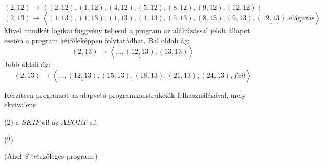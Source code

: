 \documentclass[a4paper,12pt]{article}
\theoremstyle{definition}
\begin{document}
	\begin{solution}
		\begin{stuki}[12cm]
			\begin{WHILE}{2}{}
				\begin{CASE}{1}{2}
				\end{CASE}
			\end{WHILE}
		\end{stuki}
	\[
	(2,12) \rightarrow \left\langle (2,12), (1,12), (4,12), (5,12), (8,12), (9,12), (12,12) \right\rangle
	\]
	\[
	(2,13) \rightarrow \left\langle (1,13), (1,13), (1,13), (4,13), (5,13), (8,13), (9,13), \underline{(12, 13)},\text{elágazás} \right\rangle
	\]
	Mivel mindkét logikai függvény teljesül a program az aláhúzással jelölt állapot esetén a program kétféleképpen folytatódhat.
	Bal oldali ág:
	\[
	(2,13) \rightarrow \left\langle \dots, \underline{(12, 13)}, (13,13)\right\rangle
	\]
	Jobb oldali ág:
	\[
	(2,13) \rightarrow \left\langle \dots, \underline{(12, 13)}, (15,13), (18, 13), (21, 13), (24,13), fail \right\rangle
	\]
	\end{solution}
	\setcounter{question}{-1}
	\begin{question} Készítsen programot az alapvető programkonstrukciók felhasználásával, mely ekvivalens
		\begin{tasks}(2)
			\task a $SKIP$-el!
			\task az $ABORT$-al!
		\end{tasks}
	\end{question}
	\begin{solution}
		\begin{tasks}(2)
			\task{
				\begin{stuki}[3cm]
				\begin{WHILE}{2}{\stm{HAMIS}}
					\stm{S}
				\end{WHILE}
			\end{stuki}
			}
			\task{
			\begin{stuki}[3cm]
				\begin{CASE}{1}{1}
					\WHEN{\stm{HAMIS}}
					\stm[1]{S}
				\end{CASE}
			\end{stuki}
			}
		\end{tasks}
	(Ahol $S$ tetszőleges program.)
	\end{solution}
\end{document}
